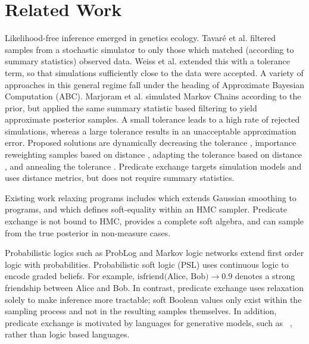 \section{Related Work}

Likelihood-free inference emerged in genetics ecology.
Tavar{\'e} et al.  
filtered samples from a stochastic simulator to only those which matched (according to summary statistics) observed data. 
Weiss et al.  extended this with a tolerance term, so that simulations sufficiently close to the data were accepted.
A variety of approaches in this general regime  \cite{beaumont2002approximate,sisson2007sequential} fall under the heading of Approximate Bayesian Computation (ABC).
Marjoram et al.  simulated Markov Chains according to the prior, but applied the same summary statistic based filtering to yield approximate posterior samples.
A small tolerance leads to a high rate of rejected simulations, whereas a large tolerance results in an unacceptable approximation error.
Proposed solutions are dynamically decreasing the tolerance \cite{toni2008approximate}, importance reweighting samples based on distance \cite{wegmann2009efficient}, adapting the tolerance based on distance \cite{del2012adaptive,lenormand2013adaptive}, and annealing the tolerance \cite{albert2015simulated}.
Predicate exchange targets simulation models and uses distance metrics, but does not require summary statistics.


Existing work relaxing programs includes \cite{chaudhuri2010smooth} which extends Gaussian smoothing to programs, and \cite{ritchie2015generating} which defines soft-equality within an HMC sampler.
Predicate exchange is not bound to HMC, provides a complete soft algebra, and can sample from the true posterior in non-measure cases.

Probabilistic logics such as ProbLog \cite{richardson2006markov} and Markov logic networks \cite{de2007problog} extend first order logic with probabilities.
Probabilistic soft logic (PSL) \cite{brocheler2012probabilistic,kimmig2012short} uses continuous logic to encode graded beliefs.
For example, $\text{isfriend(Alice, Bob)} \to 0.9$ denotes a strong friendship between Alice and Bob.
In contrast, predicate exchange uses relaxation solely to make inference more tractable; soft Boolean values only exist within the sampling process and not in the resulting samples themselves.
In addition, predicate exchange is motivated by languages for generative models, such as ~\citep{milch20071, wood2014new,mansinghka2014venture,goodman2008church}, rather than logic based languages.


